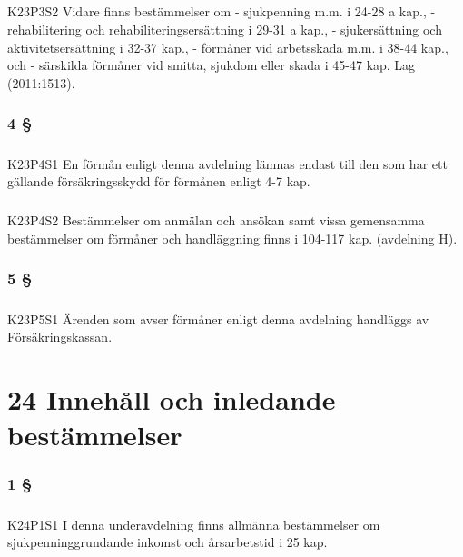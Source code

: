 \documentclass[a4paper,notitlepage,openany,10pt]{book}
\begin{document}
\paragraph*{}
{\tiny K23P3S2}
Vidare finns bestämmelser om
\newline - sjukpenning m.m. i 24-28 a kap.,
\newline - rehabilitering och rehabiliteringsersättning i 29-31 a kap.,
\newline - sjukersättning och aktivitetsersättning i 32-37 kap.,
\newline - förmåner vid arbetsskada m.m. i 38-44 kap., och
\newline - särskilda förmåner vid smitta, sjukdom eller skada i 45-47 kap.
Lag (2011:1513).
\subsection*{4 §}
\paragraph*{}
{\tiny K23P4S1}
En förmån enligt denna avdelning lämnas endast till den som har ett gällande försäkringsskydd för förmånen enligt 4-7 kap.
\paragraph*{}
{\tiny K23P4S2}
Bestämmelser om anmälan och ansökan samt vissa gemensamma bestämmelser om förmåner och handläggning finns i 104-117 kap. (avdelning H).
\subsection*{5 §}
\paragraph*{}
{\tiny K23P5S1}
Ärenden som avser förmåner enligt denna avdelning handläggs av Försäkringskassan.
\chapter*{24 Innehåll och inledande bestämmelser}
\subsection*{1 §}
\paragraph*{}
{\tiny K24P1S1}
I denna underavdelning finns allmänna bestämmelser om sjukpenninggrundande inkomst och årsarbetstid i 25 kap.
\end{document}
